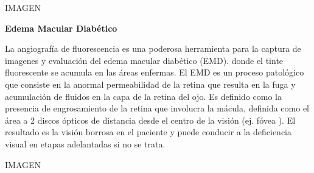 IMAGEN

\textbf{Edema Macular Diabético}

La angiografía de fluorescencia es una poderosa herramienta para la captura de imagenes y evaluación del edema macular diabético (EMD). donde el tinte fluorescente se acumula en las áreas enfermas.
El EMD es un proceso patológico que consiste en la anormal permeabilidad de la retina que resulta en la fuga y acumulación de fluidos en la capa de la retina del ojo. Es definido como la presencia de engrosamiento de la retina que involucra la mácula, definida como el área a 2 discos ópticos de distancia desde el centro de la visión (ej. fóvea ). El resultado es la visión borrosa en el paciente y puede conducir a la deficiencia visual en etapas adelantadas si no se trata. \cite{el2011segmentation}

IMAGEN

